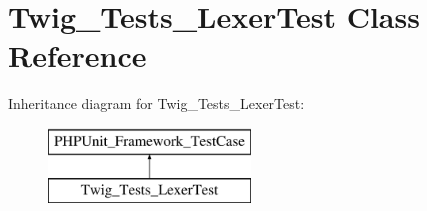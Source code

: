 \hypertarget{classTwig__Tests__LexerTest}{}\section{Twig\+\_\+\+Tests\+\_\+\+Lexer\+Test Class Reference}
\label{classTwig__Tests__LexerTest}
Inheritance diagram for Twig\+\_\+\+Tests\+\_\+\+Lexer\+Test\+:\begin{figure}[H]
\begin{center}
\leavevmode
\includegraphics[height=2.000000cm]{classTwig__Tests__LexerTest}
\end{center}
\end{figure}

